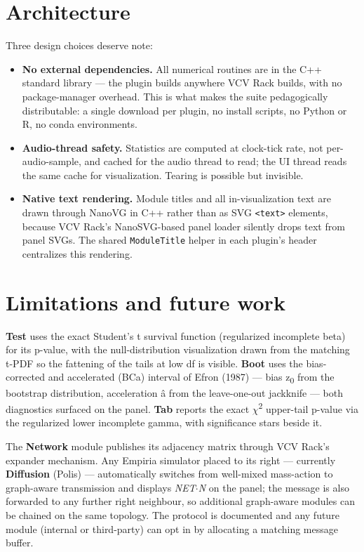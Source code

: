 \section{Architecture}\label{architecture}

Three design choices deserve note:

\begin{itemize}
\tightlist
\item
  \textbf{No external dependencies.} All numerical routines are in the
  C++ standard library --- the plugin builds anywhere VCV Rack builds,
  with no package-manager overhead. This is what makes the suite
  pedagogically distributable: a single download per plugin, no install
  scripts, no Python or R, no conda environments.
\item
  \textbf{Audio-thread safety.} Statistics are computed at clock-tick
  rate, not per-audio-sample, and cached for the audio thread to read;
  the UI thread reads the same cache for visualization. Tearing is
  possible but invisible.
\item
  \textbf{Native text rendering.} Module titles and all in-visualization
  text are drawn through NanoVG in C++ rather than as SVG
  \texttt{\textless{}text\textgreater{}} elements, because VCV Rack's
  NanoSVG-based panel loader silently drops text from panel SVGs. The
  shared \texttt{ModuleTitle} helper in each plugin's header centralizes
  this rendering.
\end{itemize}

\section{Limitations and future work}\label{limitations-and-future-work}

\textbf{Test} uses the exact Student's t survival function (regularized
incomplete beta) for its p-value, with the null-distribution
visualization drawn from the matching t-PDF so the fattening of the
tails at low df is visible. \textbf{Boot} uses the bias-corrected and
accelerated (BCa) interval of Efron (1987) --- bias z\textsubscript{0} from the
bootstrap distribution, acceleration \^a from the leave-one-out jackknife
--- both diagnostics surfaced on the panel. \textbf{Tab} reports the
exact \ensuremath{\chi}\textsuperscript{2} upper-tail p-value via the regularized lower incomplete gamma,
with significance stars beside it.

The \textbf{Network} module publishes its adjacency matrix through VCV
Rack's expander mechanism. Any Empiria simulator placed to its right ---
currently \textbf{Diffusion} (Polis) --- automatically switches from
well-mixed mass-action to graph-aware transmission and displays
\emph{NET\ensuremath{\cdot}N} on the panel; the message is also forwarded to any further
right neighbour, so additional graph-aware modules can be chained on the
same topology. The protocol is documented and any future module
(internal or third-party) can opt in by allocating a matching message
buffer.

